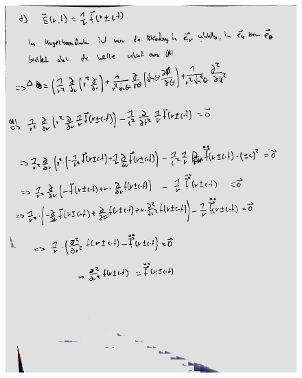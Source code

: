 \documentclass[11pt a4paper]{article}
\begin{document}
\begin{figure}[H]
	\centering
	\includegraphics[width=15cm]{roman/1d.jpg}
\end{figure}

\newpage
\setlength{\headheight}{0cm}
\end{document}
